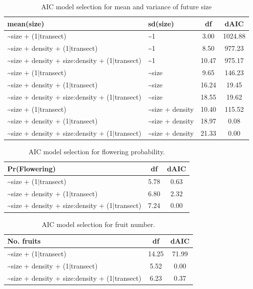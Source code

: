 \documentclass[11pt]{article}\usepackage[]{graphicx}\usepackage[usenames,dvipsnames]{xcolor}
\begin{document}
\begin{table}[ht]
\centering
\begin{tabular}{|p{8cm}|p{4cm}|c|c|}
  \hline
mean(size) & sd(size) & df & dAIC \\ 
  \hline
\~{}size + (1$|$transect) & \~{}1 & 3.00 & 1024.88 \\ 
  \~{}size + density + (1$|$transect) & \~{}1 & 8.50 & 977.23 \\ 
  \~{}size + density + size:density + (1$|$transect) & \~{}1 & 10.47 & 975.17 \\ 
  \~{}size + (1$|$transect) & \~{}size & 9.65 & 146.23 \\ 
  \~{}size + density + (1$|$transect) & \~{}size & 16.24 & 19.45 \\ 
  \~{}size + density + size:density + (1$|$transect) & \~{}size & 18.55 & 19.62 \\ 
  \~{}size + (1$|$transect) & \~{}size + density & 10.40 & 115.52 \\ 
  \~{}size + density + (1$|$transect) & \~{}size + density & 18.97 & 0.08 \\ 
  \~{}size + density + size:density + (1$|$transect) & \~{}size + density & 21.33 & 0.00 \\ 
   \hline
\end{tabular}
\caption{AIC model selection for mean and variance of future size} 
\label{tab:grow_aic}
\end{table}



\begin{table}[ht]
\centering
\begin{tabular}{|p{8cm}|c|c|}
  \hline
Pr(Flowering) & df & dAIC \\ 
  \hline
\~{}size + (1$|$transect) & 5.78 & 0.63 \\ 
  \~{}size + density + (1$|$transect) & 6.80 & 2.32 \\ 
  \~{}size + density + size:density + (1$|$transect) & 7.24 & 0.00 \\ 
   \hline
\end{tabular}
\caption{AIC model selection for flowering probability.} 
\label{tab:flow_aic}
\end{table}



\begin{table}[ht]
\centering
\begin{tabular}{|p{8cm}|c|c|}
  \hline
No. fruits & df & dAIC \\ 
  \hline
\~{}size + (1$|$transect) & 14.25 & 71.99 \\ 
  \~{}size + density + (1$|$transect) & 5.52 & 0.00 \\ 
  \~{}size + density + size:density + (1$|$transect) & 6.23 & 0.37 \\ 
   \hline
\end{tabular}
\caption{AIC model selection for fruit number.} 
\label{tab:fruit_aic}
\end{table}
\end{document}
